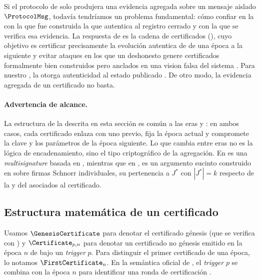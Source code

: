
Si el protocolo \STM de \Mithril solo produjera una evidencia agregada sobre un mensaje aislado $\ProtocolMsg$, todavía tendríamos un problema fundamental: cómo confiar en la \StakeDistribution con la que fue construida la \AVK que autentica al registro cerrado \AuthReg y con la que se verifica esa evidencia. La respuesta de \Mithril es la cadena de certificados (\CertificateChain), cuyo objetivo es certificar precisamente la evolución autentica de \AuthReg de una época a la siguiente y evitar ataques en los que un \MithrilAggregator deshonesto genere certificados formalmente bien construidos pero anclados en una vision falsa del sistema \cite{MithrilDocsCertChain,MithrilDocsThreatModel}. Para nuestro \zkBridge, la \CertificateChain otorga autenticidad al estado publicado \Onchain. De otro modo, la evidencia agregada de un certificado \TransactionSnapshotCertificate no basta.

\paragraph{Advertencia de alcance.}
La estructura de la \CertificateChain descrita en esta sección es común a las eras \Pythagoras y \Lagrange: en ambos casos, cada certificado enlaza con uno previo, fija la época actual y compromete la clave y los parámetros de la época siguiente. Lo que cambia entre eras no es la lógica de encadenamiento, sino el tipo criptográfico de la agregación. En \Pythagoras es una \textit{multisignature} basada en \BLS, mientras que en \Lagrange, es un argumento sucinto construido en \HaloTwo sobre firmas Schnorr individuales, su pertenencia a $J^*$ con $|J^*| = k$ respecto de la \AVK y del \ProtocolMsg asociados al certificado.

\subsection{Estructura matemática de un certificado}

Usamos $\GenesisCertificate$ para denotar el certificado génesis (que se verifica con \GenesisVerificationKey) y $\Certificate_{p,n}$ para denotar un certificado no génesis emitido en la época $n$ de \Cardano bajo un \textit{trigger} \(p\). Para distinguir el primer certificado de una época, lo notamos $\FirstCertificate_{n}$. En la semántica oficial de \Mithril, el \textit{trigger} $p$ se combina con la época $n$ para identificar una ronda de certificación \cite{MithrilDocsCertChain}.

